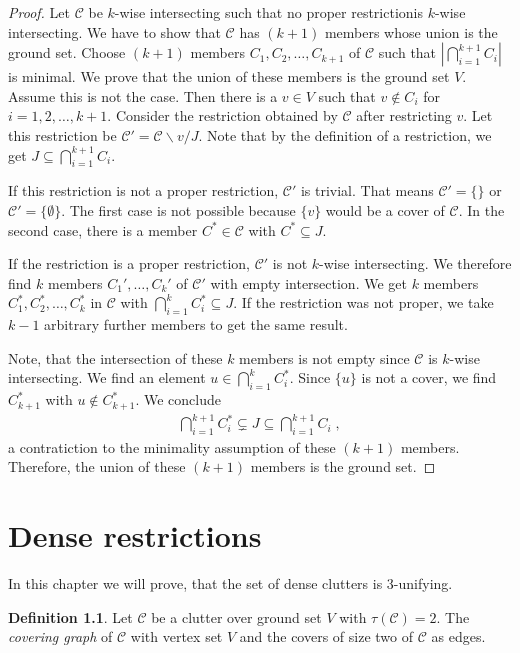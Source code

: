 \documentclass[a4paper, 12pt, twoside=false]{scrbook}
\theoremstyle{definition}
\newtheorem{definition}{Definition}
\begin{document}
   \begin{proof}
       Let $\mathcal{C}$ be $k$-wise intersecting such that no proper restrictionis $k$-wise intersecting.
       We have to show that $\mathcal{C}$ has $(k+1)$ members whose union is the ground set.
       Choose $(k+1)$ members $C_1, C_2, \ldots, C_{k+1}$ of $\mathcal{C}$ such that $|\bigcap_{i=1}^{k+1} C_i|$ is minimal.
       We prove that the union of these members is the ground set $V$.
       Assume this is not the case.
       Then there is a $v \in V$ such that $v \not\in C_i$ for $i=1,2, \ldots, k+1$.
       Consider the restriction obtained by $\mathcal{C}$ after restricting $v$.
       Let this restriction be $\mathcal{C'}=\mathcal{C} \backslash v / J$.
       Note that by the definition of a restriction, we get $J \subseteq \bigcap_{i=1}^{k+1} C_i$.

       If this restriction is not a proper restriction, $\mathcal{C'}$ is trivial.
       That means $\mathcal{C'}=\{\}$ or $\mathcal{C'}=\{\emptyset\}$.
       The first case is not possible because $\{v\}$ would be a cover of $\mathcal{C}$.
       In the second case, there is a member $C^* \in \mathcal{C}$ with $C^* \subseteq J$.

       If the restriction is a proper restriction, $\mathcal{C'}$ is not $k$-wise intersecting. We therefore find $k$ members $C_1',\ldots, C_k'$ of $\mathcal{C'}$ with empty intersection. We get $k$ members $C_1^*, C_2^*,\ldots, C_k^*$ in $\mathcal{C}$ with $\bigcap_{i=1}^k C_i^* \subseteq J$.
       If the restriction was not proper, we take $k-1$ arbitrary further members to get the same result.

       Note, that the intersection of these $k$ members is not empty since $\mathcal{C}$ is $k$-wise intersecting.
       We find an element $u \in \bigcap_{i=1}^k C_i^*$. Since $\{u\}$ is not a cover, we find $C_{k+1}^*$ with $u \not\in C_{k+1}^*$.
       We conclude
       \begin{align*}
           \bigcap_{i=1}^{k+1} C_i^* \subsetneq J \subseteq \bigcap_{i=1}^{k+1} C_i \;,
       \end{align*}
       a contratiction to the minimality assumption of these $(k+1)$ members.
       Therefore, the union of these $(k+1)$ members is the ground set.


   \end{proof}

   \chapter{Dense restrictions}
   In this chapter we will prove, that the set of dense clutters is 3-unifying.
   \begin{definition}
       Let $\mathcal{C}$ be a clutter over ground set $V$ with $\tau(\mathcal{C})=2$.
       The \emph{covering graph} of $\mathcal{C}$ with vertex set $V$ and the covers of size two of $\mathcal{C}$ as edges.
   \end{definition}
\end{document}
